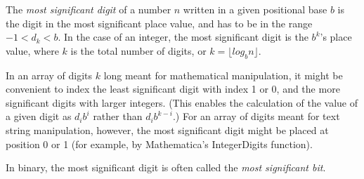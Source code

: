 \documentclass[12pt]{article}
\begin{document}
The {\em most significant digit} of a number $n$ written in a given positional base $b$ is the digit in the most significant place value, and has to be in the range $-1 < d_k < b$. In the case of an integer, the most significant digit is the $b^k$'s place value, where $k$ is the total number of digits, or $k = \lfloor log_{b} n \rfloor$.

In an array of digits $k$ long meant for mathematical manipulation, it might be convenient to index the least significant digit with index 1 or 0, and the more significant digits with larger integers. (This enables the calculation of the value of a given digit as $d_ib^i$  rather than $d_ib^{k - i}$.) For an array of digits meant for text string manipulation, however, the most significant digit might be placed at position 0 or 1 (for example, by Mathematica's IntegerDigits function).

In binary, the most significant digit is often called the {\em most significant bit}.
\end{document}
